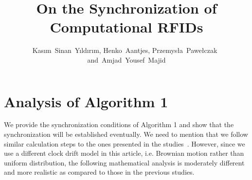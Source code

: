 \documentclass[10pt,journal,compsoc]{IEEEtran}
\begin{document}
\title{On the Synchronization of Computational RFIDs}

\author{Kas{\i}m~Sinan~Y{\i}ld{\i}r{\i}m, 
	Henko~Aantjes, 
	Przemys{\l}a~Pawe{\l}czak~ 
	and~Amjad~Yousef~Majid
}

\maketitle

\IEEEdisplaynontitleabstractindextext

\IEEEpeerreviewmaketitle


\appendices
\section{Analysis of Algorithm 1}

We provide the synchronization conditions of Algorithm 1 and show that the synchronization will be established eventually. We need to mention that we follow similar calculation steps to the ones presented in the studies~\cite{pi2015,Yildirim:Gradient:2016}. However, since we use a different clock drift model in this article, i.e. Brownian motion rather than uniform distribution, the following  mathematical analysis is moderately different and more realistic as compared to those in the previous studies. 
\end{document}
